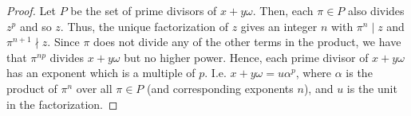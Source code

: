 \begin{proof}
    Let $P$ be the set of prime divisors of $x+y\omega$. Then, each $\pi \in P$ also divides $z^p$ and so $z$. Thus, the unique factorization of $z$ gives an integer $n$ with $\pi^n \mid z$ and $\pi^{n+1} \nmid z$. Since $\pi$ does not divide any of the other terms in the product, we have that $\pi^{np}$ divides $x+y\omega$ but no higher power. Hence, each prime divisor of $x+y\omega$ has an exponent which is a multiple of $p$. I.e. $x+y\omega = u\alpha^p$, where $\alpha$ is the product of $\pi^n$ over all $\pi \in P$ (and corresponding exponents $n$), and $u$ is the unit in the factorization.
\end{proof}